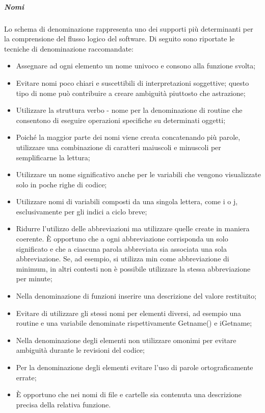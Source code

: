 \subparagraph{Nomi}
Lo schema di denominazione rappresenta uno dei supporti più determinanti per la comprensione del flusso logico del software.
Di seguito sono riportate le tecniche di denominazione raccomandate:
\begin{itemize}
\item
Assegnare ad ogni elemento un nome univoco e consono alla funzione svolta;
\item
Evitare nomi poco chiari e suscettibili di interpretazioni soggettive; questo tipo di nome può contribuire a creare ambiguità piuttosto che astrazione;
\item
Utilizzare la struttura verbo - nome per la denominazione di routine che consentono di eseguire operazioni specifiche su determinati oggetti;
\item
Poiché la maggior parte dei nomi viene creata concatenando più parole, utilizzare una combinazione di caratteri maiuscoli e minuscoli per semplificarne la lettura;
\item
Utilizzare un nome significativo anche per le variabili che vengono visualizzate solo in poche righe di codice;
\item
Utilizzare nomi di variabili composti da una singola lettera, come i o j, esclusivamente per gli indici a ciclo breve;
\item
Ridurre l'utilizzo delle abbreviazioni ma utilizzare quelle create in maniera coerente. È opportuno che a ogni abbreviazione corrisponda un solo significato e che a ciascuna parola abbreviata sia associata una sola abbreviazione. Se, ad esempio, si utilizza min come abbreviazione di minimum, in altri contesti non è possibile utilizzare la stessa abbreviazione per minute;
\item
Nella denominazione di funzioni inserire una descrizione del valore restituito;
\item
Evitare di utilizzare gli stessi nomi per elementi diversi, ad esempio una routine e una variabile denominate rispettivamente Getname() e iGetname;
\item
Nella denominazione degli elementi non utilizzare omonimi per evitare ambiguità durante le revisioni del codice;
\item
Per la denominazione degli elementi evitare l'uso di parole ortograficamente errate;
\item
È opportuno che nei nomi di file e cartelle sia contenuta una descrizione precisa della relativa funzione.
\end{itemize}


